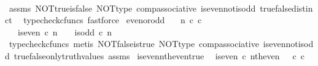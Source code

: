 \begin{isabellebody}
%
\isadelimproof
\ \ %
\endisadelimproof
%
\isatagproof
{}\isamarkupfalse%
\ assms\ NOT{\isacharunderscore}{\kern0pt}true{\isacharunderscore}{\kern0pt}is{\isacharunderscore}{\kern0pt}false\ NOT{\isacharunderscore}{\kern0pt}type\ comp{\isacharunderscore}{\kern0pt}associative{}\ is{\isacharunderscore}{\kern0pt}even{\isacharunderscore}{\kern0pt}not{\isacharunderscore}{\kern0pt}is{\isacharunderscore}{\kern0pt}odd\ true{\isacharunderscore}{\kern0pt}false{\isacharunderscore}{\kern0pt}distinct\ \isamarkupfalse%
\ {\isacharparenleft}{\kern0pt}typecheck{\isacharunderscore}{\kern0pt}cfuncs{\isacharcomma}{\kern0pt}\ fastforce{\isacharparenright}{\kern0pt}%
\endisatagproof
{\isafoldproof}%
%
\isadelimproof
\isanewline
%
\endisadelimproof
\isanewline
{}\isamarkupfalse%
\ even{\isacharunderscore}{\kern0pt}or{\isacharunderscore}{\kern0pt}odd{\isacharcolon}{\kern0pt}\isanewline
\ \ \ {\isachardoublequoteopen}n\ {\isasymin}\isactrlsub c\ {\isasymnat}\isactrlsub c{\isachardoublequoteclose}\isanewline
\ \ \ {\isachardoublequoteopen}{\isacharparenleft}{\kern0pt}is{\isacharunderscore}{\kern0pt}even\ {\isasymcirc}\isactrlsub c\ n\ {\isacharequal}{\kern0pt}\ {\isasymt}{\isacharparenright}{\kern0pt}\ {\isasymor}\ {\isacharparenleft}{\kern0pt}is{\isacharunderscore}{\kern0pt}odd\ {\isasymcirc}\isactrlsub c\ n\ {\isacharequal}{\kern0pt}\ {\isasymt}{\isacharparenright}{\kern0pt}{\isachardoublequoteclose}\isanewline
%
\isadelimproof
\ \ %
\endisadelimproof
%
\isatagproof
{}\isamarkupfalse%
\ {\isacharparenleft}{\kern0pt}typecheck{\isacharunderscore}{\kern0pt}cfuncs{\isacharcomma}{\kern0pt}\ metis\ NOT{\isacharunderscore}{\kern0pt}false{\isacharunderscore}{\kern0pt}is{\isacharunderscore}{\kern0pt}true\ NOT{\isacharunderscore}{\kern0pt}type\ comp{\isacharunderscore}{\kern0pt}associative{}\ is{\isacharunderscore}{\kern0pt}even{\isacharunderscore}{\kern0pt}not{\isacharunderscore}{\kern0pt}is{\isacharunderscore}{\kern0pt}odd\ true{\isacharunderscore}{\kern0pt}false{\isacharunderscore}{\kern0pt}only{\isacharunderscore}{\kern0pt}truth{\isacharunderscore}{\kern0pt}values\ assms{\isacharparenright}{\kern0pt}%
\endisatagproof
{\isafoldproof}%
%
\isadelimproof
\isanewline
%
\endisadelimproof
\isanewline
{}\isamarkupfalse%
\ is{\isacharunderscore}{\kern0pt}even{\isacharunderscore}{\kern0pt}nth{\isacharunderscore}{\kern0pt}even{\isacharunderscore}{\kern0pt}true{\isacharcolon}{\kern0pt}\isanewline
\ \ {\isachardoublequoteopen}is{\isacharunderscore}{\kern0pt}even\ {\isasymcirc}\isactrlsub c\ nth{\isacharunderscore}{\kern0pt}even\ {\isacharequal}{\kern0pt}\ {\isasymt}\ {\isasymcirc}\isactrlsub c\ {\isasymbeta}\isactrlbsub {\isasymnat}\isactrlsub c\isactrlesub {\isachardoublequoteclose}\isanewline

\end{isabellebody}
